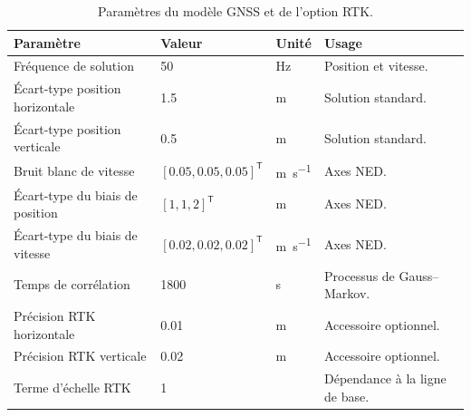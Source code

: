 \documentclass[11pt,a4paper,oneside]{report}
\newcommand{\trans}{^{\mathsf T}}
\begin{document}
	\begin{table}[H]
		\centering
		\caption{Paramètres du modèle GNSS et de l'option RTK.}
		\label{tab_gnss}
		\begin{tabularx}{\textwidth}{@{}L{5.2cm}L{3.4cm}L{2.8cm}Y@{}}
			\toprule
			\textbf{Paramètre} & \textbf{Valeur} & \textbf{Unité} & \textbf{Usage}\\
			\midrule
			Fréquence de solution & \num{50} & \si{Hz} & Position et vitesse.\\
			Écart-type position horizontale & \num{1.5} & \si{m} & Solution standard.\\
			Écart-type position verticale & \num{0.5} & \si{m} & Solution standard.\\
			Bruit blanc de vitesse & $[0.05,0.05,0.05]\trans$ & \si{m.s^{-1}} & Axes NED.\\
			Écart-type du biais de position & $[1,1,2]\trans$ & \si{m} & Axes NED.\\
			Écart-type du biais de vitesse & $[0.02,0.02,0.02]\trans$ & \si{m.s^{-1}} & Axes NED.\\
			Temps de corrélation & \num{1800} & \si{s} & Processus de Gauss--Markov.\\
			Précision RTK horizontale & \num{0.01} & \si{m} & Accessoire optionnel.\\
			Précision RTK verticale & \num{0.02} & \si{m} & Accessoire optionnel.\\
			Terme d'échelle RTK & \num{1} & \si{\ppm} & Dépendance à la ligne de base.\\
			\bottomrule
		\end{tabularx}
	\end{table}
	
\end{document}
